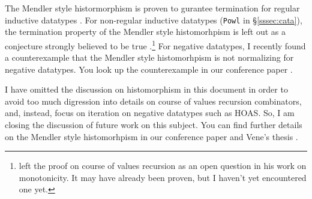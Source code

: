 The Mendler style histormorphism is proven to gurantee termination for regular
inductive datatypes \cite{vene00phd}.
For non-regular inductive datatypes (\eg \texttt{Powl} in \S\ref{sssec:cata}),
the termination property of the Mendler style histomorhpism is left out as
a conjecture strongly believed to be true \cite{Mat01}.\footnote{
\citet{Mat01} left the proof on course of values recursion as an open question
in his work on monotonicity.
It may have already been proven, but I haven't yet encountered one yet.}
For negative datatypes, I recently found a counterexample that
the Mendler style histomorhpism is not normalizing for negative datatypes.
You look up the counterexample in our conference paper \cite{AhnShe11}.

I have omitted the discussion on histomorphism in this document
in order to avoid too much digression into details on course of values
recursion combinators, and, instead, focus on iteration on negative datatypes
such as HOAS. So, I am closing the discussion of future work on this subject.
You can find further details on the Mendler style histomorhpism
in our conference paper \cite{AhnShe11} and Vene's thesis \cite{vene00phd}.

